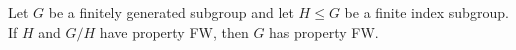 \begin{lem}
Let $G$ be a finitely generated subgroup and let $H\leq G$ be a finite index subgroup. If $H$ and $G/H$ have property FW, then $G$ has property FW. 
\end{lem}
%
%
